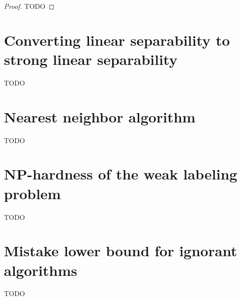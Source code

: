 \documentclass[12pt]{article}
\begin{document}
\begin{proof}
TODO
\end{proof}


\section{Converting linear separability to strong linear separability}

TODO


\section{Nearest neighbor algorithm}

TODO


\section{NP-hardness of the weak labeling problem}

TODO


\section{Mistake lower bound for ignorant algorithms}

TODO





\end{document}

